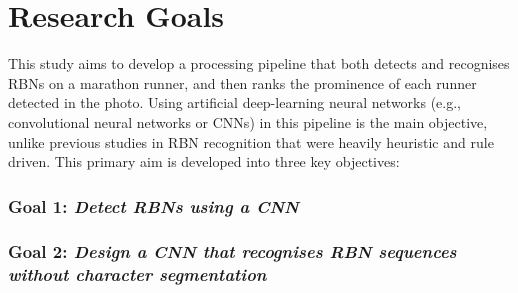 \section{Research Goals}
\label{sec:research_goals}

This study aims to develop a processing pipeline that both detects and recognises RBNs on a marathon runner, and then ranks the prominence of each runner detected in the photo. Using artificial deep-learning neural networks (e.g., convolutional neural networks or CNNs) in this pipeline is the main objective, unlike previous studies in RBN recognition that were heavily heuristic and rule driven. This primary aim is developed into three key objectives:




\subsubsection*{Goal 1: \itshape Detect RBNs using a CNN}




\blindtext


\subsubsection*{Goal 2: \itshape Design a CNN that recognises RBN sequences without character segmentation}

